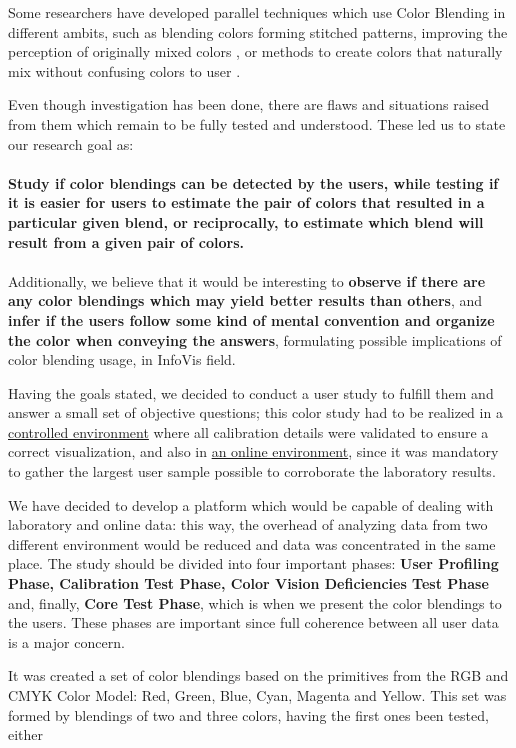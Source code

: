 %
Some researchers have developed parallel techniques which use Color Blending in different
ambits, such as blending colors forming stitched patterns, improving the perception of originally mixed
colors \cite{Urness2003}, or methods to create colors that naturally mix without confusing colors to user \cite{Chuang2009}. \par
%
Even though investigation has been done, there are flaws and situations raised from them which remain to be fully
tested and understood. These led us to state our research goal as: \\ \\
%
\textbf{Study if color blendings can be detected by the users, while testing if it is easier for
users to estimate the pair of colors that resulted in a particular given blend, or reciprocally, to estimate
which blend will result from a given pair of colors.} \\ \\
%
Additionally, we believe that it would be interesting to \textbf{observe if there are any color blendings which
may yield better results than others}, and \textbf{infer if the users follow some kind of mental convention and
organize the color when conveying the answers}, formulating possible implications of color blending usage, in
InfoVis field. \par
%
Having the goals stated, we decided to conduct a user study to fulfill them and answer a small set of objective
questions; this color study had to be realized in a \ul{controlled environment} where all calibration
details were validated to ensure a correct visualization, and also in \ul{an online environment}, since it
was mandatory to gather the largest user sample possible to corroborate the laboratory results. \par
%
We have decided to develop a platform which would be capable of dealing with laboratory and online data: this way,
the overhead of analyzing data from two different environment would be reduced and data was concentrated in the same
place. The study should be divided into four important phases: \textbf{User Profiling Phase, Calibration Test Phase,
Color Vision Deficiencies Test Phase} and, finally, \textbf{Core Test Phase}, which is when we present the color
blendings to the users. These phases are important since full coherence between all user data is a major concern. \par
%
It was created a set of color blendings based on the primitives from the RGB and CMYK Color Model: Red, Green, Blue,
Cyan, Magenta and Yellow. This set was formed by blendings of two and three colors, having the first ones been tested, either
